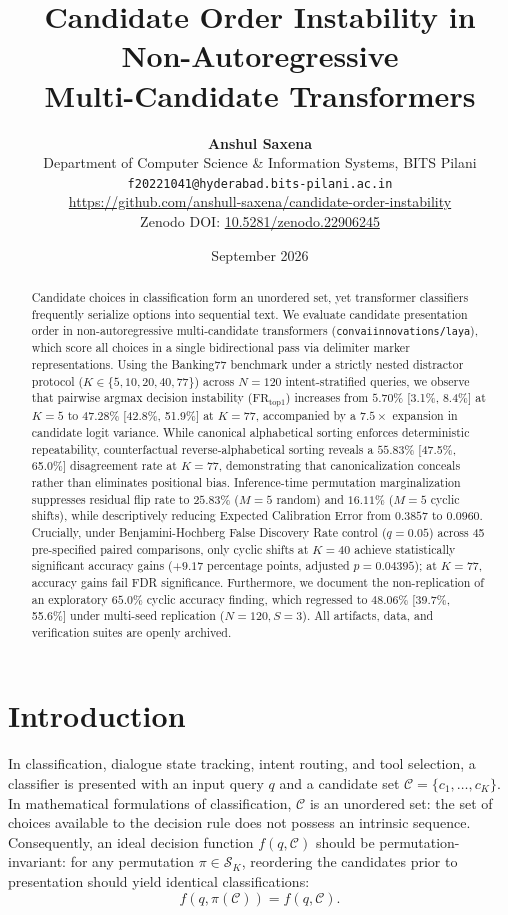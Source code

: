\documentclass[11pt,a4paper]{article}
\title{\textbf{Candidate Order Instability in Non-Autoregressive\\Multi-Candidate Transformers}}
\author{
  \textbf{Anshul Saxena} \\
  Department of Computer Science \& Information Systems, BITS Pilani \\
  \texttt{f20221041@hyderabad.bits-pilani.ac.in} \\
  \url{https://github.com/anshull-saxena/candidate-order-instability} \\
  \small{Zenodo DOI: \href{https://doi.org/10.5281/zenodo.22906245}{10.5281/zenodo.22906245}}
}
\date{September 2026}
\begin{document}
\maketitle

\begin{abstract}
Candidate choices in classification form an unordered set, yet transformer classifiers frequently serialize options into sequential text. We evaluate candidate presentation order in non-autoregressive multi-candidate transformers (\texttt{convaiinnovations/laya}), which score all choices in a single bidirectional pass via delimiter marker representations. Using the Banking77 benchmark under a strictly nested distractor protocol ($K \in \{5, 10, 20, 40, 77\}$) across $N=120$ intent-stratified queries, we observe that pairwise argmax decision instability ($\mathrm{FR}_{\mathrm{top1}}$) increases from $5.70\%$ [3.1\%, 8.4\%] at $K=5$ to $47.28\%$ [42.8\%, 51.9\%] at $K=77$, accompanied by a $7.5\times$ expansion in candidate logit variance. While canonical alphabetical sorting enforces deterministic repeatability, counterfactual reverse-alphabetical sorting reveals a $55.83\%$ [47.5\%, 65.0\%] disagreement rate at $K=77$, demonstrating that canonicalization conceals rather than eliminates positional bias. Inference-time permutation marginalization suppresses residual flip rate to $25.83\%$ ($M=5$ random) and $16.11\%$ ($M=5$ cyclic shifts), while descriptively reducing Expected Calibration Error from $0.3857$ to $0.0960$. Crucially, under Benjamini-Hochberg False Discovery Rate control ($q=0.05$) across 45 pre-specified paired comparisons, only cyclic shifts at $K=40$ achieve statistically significant accuracy gains ($+9.17$ percentage points, adjusted $p=0.04395$); at $K=77$, accuracy gains fail FDR significance. Furthermore, we document the non-replication of an exploratory $65.0\%$ cyclic accuracy finding, which regressed to $48.06\%$ [39.7\%, 55.6\%] under multi-seed replication ($N=120, S=3$). All artifacts, data, and verification suites are openly archived.
\end{abstract}

\section{Introduction}

In classification, dialogue state tracking, intent routing, and tool selection, a classifier is presented with an input query $q$ and a candidate set $\mathcal{C} = \{c_1, \dots, c_K\}$. In mathematical formulations of classification, $\mathcal{C}$ is an unordered set: the set of choices available to the decision rule does not possess an intrinsic sequence. Consequently, an ideal decision function $f(q, \mathcal{C})$ should be permutation-invariant: for any permutation $\pi \in \mathcal{S}_K$, reordering the candidates prior to presentation should yield identical classifications:
\begin{equation}
f(q, \pi(\mathcal{C})) = f(q, \mathcal{C}).
\end{equation}
\end{document}
